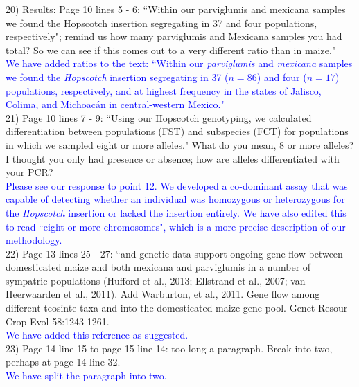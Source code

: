\documentclass[11pt]{article}
\newcommand{\res}[1]{\noindent \textcolor{blue}{{#1}} \\}
\begin{document}
20) Results:
Page 10 lines 5 - 6: ``Within our parviglumis and mexicana samples we found the Hopscotch insertion segregating in 37 and four populations, respectively"; remind us how many parviglumis and Mexicana samples you had total? So we can see if this comes out to a very different ratio than in maize."\\ 

\res{We have added ratios to the text: ``Within our \emph{parviglumis} and \emph{mexicana} samples we found the \emph{Hopscotch} insertion segregating in 37 ($n=86$) and four ($n=17$) populations, respectively, and at highest frequency in the states of Jalisco, Colima, and Michoac\'{a}n in central-western Mexico."}

21) Page 10 lines 7 - 9: ``Using our Hopscotch genotyping, we calculated diﬀerentiation between populations (FST) and subspecies (FCT) for populations in which we sampled eight or more alleles." What do you mean, 8 or more alleles? I thought you only had presence or absence; how are alleles differentiated with your PCR?\\ 

\res{Please see our response to point 12.  We developed a co-dominant assay that was capable of detecting whether an individual was homozygous or heterozygous for the \emph{Hopscotch} insertion or lacked the insertion entirely.  We have also edited this to read ``eight or more chromosomes", which is a more precise description of our methodology.}

22) Page 13 lines 25 - 27: ``and genetic data support ongoing gene flow between domesticated maize and both mexicana and parviglumis in a number of sympatric populations (Hufford et al., 2013; Ellstrand et al., 2007; van Heerwaarden et al., 2011). Add Warburton, et al., 2011.  Gene flow among different teosinte taxa and into the domesticated maize gene pool.  Genet Resour Crop Evol 58:1243-1261.\\ 

\res{We have added this reference as suggested.}

23) Page 14 line 15 to page 15 line 14: too long a paragraph. Break into two, perhaps at page 14 line 32.\\ 

\res{We have split the paragraph into two.}


\end{document}
